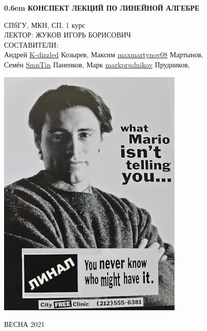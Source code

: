 \documentclass[12pt,letterpaper]{report}
\theoremstyle{definition}
\begin{document}
\clearpage
\newcommand\nbvspace[1][3]{\vspace*{\stretch{#1}}}
\newcommand\nbstretchyspace{\spaceskip0.5em plus 0.25em minus 0.25em}
\newcommand{\nbtitlestretch}{\spaceskip0.6em}
\pagestyle{empty}
\begin{center}
\bfseries
\nbvspace[1]
\Huge
{\nbtitlestretch\huge
КОНСПЕКТ ЛЕКЦИЙ ПО ЛИНЕЙНОЙ АЛГЕБРЕ}

\nbvspace[1]
\normalsize

СПбГУ, МКН, СП, 1 курс\\
ЛЕКТОР: ЖУКОВ ИГОРЬ БОРИСОВИЧ
\nbvspace[1]
\\
\Large СОСТАВИТЕЛИ:\\[0.5em]
\footnotesize 
Андрей \href{https://github.com/K-dizzled}{K-dizzled} Козырев, 
Максим \href{https://github.com/maxmartynov08}{maxmartynov08} Мартынов,\\ 
Семён \href{https://github.com/SmnTin}{SmnTin} Паненков,
Марк \href{https://github.com/markprudnikov}{markprudnikov} Прудников,

\nbvspace[2]

\includegraphics[width=3.5in]{./images/linal03.png}
\nbvspace[3]
\normalsize

\large
ВЕСНА 2021
\nbvspace[1]
\end{center}
\end{document}
